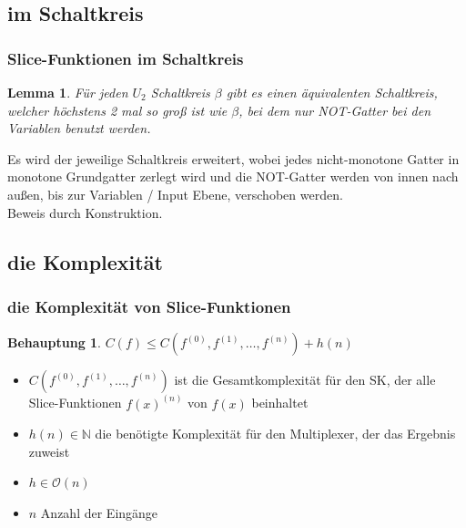 \documentclass[hyperref={pdfpagelabels=false}]{beamer} %
\newtheorem{lem}{Lemma}
\newtheorem{beh}{Behauptung}
\begin{document}
  \subsection{im Schaltkreis}
  \begin{frame}%
    \frametitle{Slice-Funktionen im Schaltkreis}
    \begin{lem}
      Für jeden $U_2$ Schaltkreis $\beta$ gibt es einen äquivalenten Schaltkreis, welcher höchstens
      2 mal so groß ist wie $\beta$, bei dem nur NOT-Gatter bei den Variablen benutzt werden. %
    \end{lem}
    Es wird der jeweilige Schaltkreis erweitert, wobei jedes nicht-monotone Gatter in monotone Grundgatter zerlegt wird und die NOT-Gatter werden von innen nach außen, bis zur Variablen / Input Ebene, verschoben werden.
    \\Beweis durch Konstruktion.
  \end{frame}

  \subsection{die Komplexität}
  \begin{frame}%
    \frametitle{die Komplexität von Slice-Funktionen}
    \begin{beh}
      $C(f) \leq C(f^{(0)}, f^{(1)}, \dots ,f^{(n)})+h(n)$\\
    \end{beh}
    \begin{itemize}
      \item $C(f^{(0)}, f^{(1)}, \dots ,f^{(n)})$ ist die Gesamtkomplexität für den SK, der alle Slice-Funktionen $f(x)^{(n)}$ von $f(x)$ beinhaltet
      \item $h(n) \in \mathbb{N}$ die benötigte Komplexität für den Multiplexer, der das Ergebnis zuweist
      \item $h \in \mathcal{O}(n)$
      \item $n$ Anzahl der Eingänge
    \end{itemize}
  \end{frame}
\end{document}
